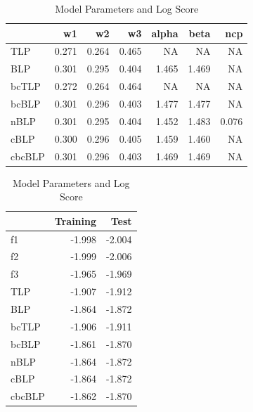 \documentclass[]{article}
\begin{document}
\begin{table}[!h]
\caption{\label{tab:unnamed-chunk-3}Model Parameters and Log Score}

\centering
\begin{tabular}[t]{lrrrrrr}
\toprule
  & w1 & w2 & w3 & alpha & beta & ncp\\
\midrule
\rowcolor{gray!6}  TLP & 0.271 & 0.264 & 0.465 & NA & NA & NA\\
BLP & 0.301 & 0.295 & 0.404 & 1.465 & 1.469 & NA\\
\rowcolor{gray!6}  bcTLP & 0.272 & 0.264 & 0.464 & NA & NA & NA\\
bcBLP & 0.301 & 0.296 & 0.403 & 1.477 & 1.477 & NA\\
\rowcolor{gray!6}  nBLP & 0.301 & 0.295 & 0.404 & 1.452 & 1.483 & 0.076\\
\addlinespace
cBLP & 0.300 & 0.296 & 0.405 & 1.459 & 1.460 & NA\\
\rowcolor{gray!6}  cbcBLP & 0.301 & 0.296 & 0.403 & 1.469 & 1.469 & NA\\
\bottomrule
\end{tabular}
\centering
\begin{tabular}[t]{lrr}
\toprule
  & Training & Test\\
\midrule
\rowcolor{gray!6}  f1 & -1.998 & -2.004\\
f2 & -1.999 & -2.006\\
\rowcolor{gray!6}  f3 & -1.965 & -1.969\\
TLP & -1.907 & -1.912\\
\rowcolor{gray!6}  BLP & -1.864 & -1.872\\
\addlinespace
bcTLP & -1.906 & -1.911\\
\rowcolor{gray!6}  bcBLP & -1.861 & -1.870\\
nBLP & -1.864 & -1.872\\
\rowcolor{gray!6}  cBLP & -1.864 & -1.872\\
cbcBLP & -1.862 & -1.870\\
\bottomrule
\end{tabular}
\end{table}
\end{document}

